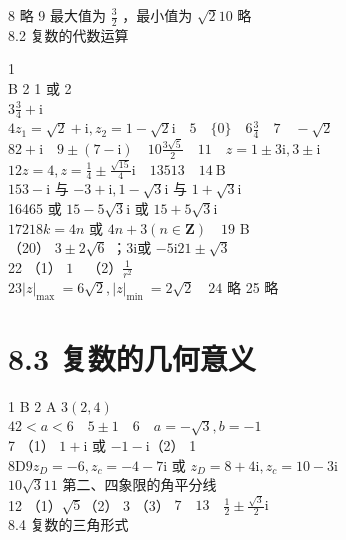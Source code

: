 \documentclass[10pt]{article}
\begin{document}
8 略 9 最大值为 \(\frac{3}{2}\) ，最小值为 \(\sqrt{2} 10\) 略\\
8.2 复数的代数运算

1\\
B 2 1 或 2\\
\(3 \frac{3}{4}+\mathrm{i}\)\\
\(4 z_{1}=\sqrt{2}+\mathrm{i}, z_{2}=1-\sqrt{2} \mathrm{i} \quad 5 \quad\{0\} \quad 6 \frac{3}{4} \quad 7 \quad-\sqrt{2}\)\\
\(82+\mathrm{i} \quad 9 \pm(7-\mathrm{i}) \quad 10 \frac{3 \sqrt{5}}{2} \quad 11 \quad z=1 \pm 3 \mathrm{i}, 3 \pm \mathrm{i}\)\\
\(12 z=4, z=\frac{1}{4} \pm \frac{\sqrt{15}}{4} \mathrm{i} \quad 13513 \quad 14 \mathrm{~B}\)\\
\(153-\mathrm{i}\) 与 \(-3+\mathrm{i}, 1-\sqrt{3} \mathrm{i}\) 与 \(1+\sqrt{3} \mathrm{i}\)\\
16465 或 \(15-5 \sqrt{3} \mathrm{i}\) 或 \(15+5 \sqrt{3} \mathrm{i}\)\\
\(17218 k=4 n\) 或 \(4 n+3(n \in \mathbf{Z}) \quad 19\) B\\
（20） \(3 \pm 2 \sqrt{6}\) ；3i或 \(-5 \mathrm{i} 21 \pm \sqrt{3}\)\\
22 （1） \(1 \quad\)（2）\(\frac{1}{r^{2}}\)\\
\(23|z|_{\text {max }}=6 \sqrt{2},|z|_{\text {min }}=2 \sqrt{2} \quad 24\) 略 25 略

\section*{8.3 复数的几何意义}
1 B 2 A \(3(2,4)\)\\
\(42<a<6 \quad 5 \pm 1 \quad 6 \quad a=-\sqrt{3}, b=-1\)\\
7 （1） \(1+\mathrm{i}\) 或 \(-1-\mathrm{i}\)（2） 1\\
\(8 \mathrm{D} 9 z_{D}=-6, z_{c}=-4-7 \mathrm{i}\) 或 \(z_{D}=8+4 \mathrm{i}, z_{c}=10-3 \mathrm{i}\)\\
\(10 \sqrt{3} 11\) 第二、四象限的角平分线\\
12 （1）\(\sqrt{5}\)（2） 3 （3） \(7 \quad 13 \quad \frac{1}{2} \pm \frac{\sqrt{3}}{2} \mathrm{i}\)\\
8.4 复数的三角形式
\end{document}
